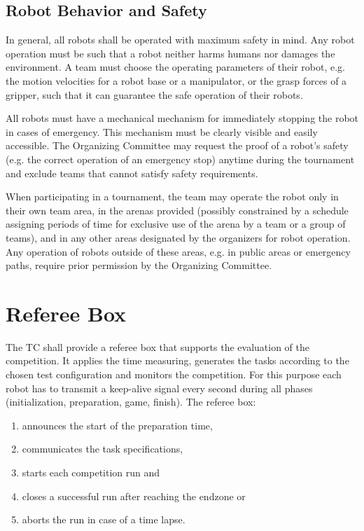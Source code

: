 \subsection{Robot Behavior and Safety}
In general, all robots shall be operated with maximum safety in mind. Any robot operation must be such that a robot neither harms humans nor damages the environment. A team must choose the operating parameters of their robot, e.g. the motion velocities for a robot base or a manipulator, or the grasp forces of a gripper, such that it can guarantee the safe operation of their robots.
\par
All robots must have a mechanical mechanism for immediately stopping the robot in cases of emergency. This mechanism must be clearly visible and easily accessible. The Organizing Committee may request the proof of a robot’s safety (e.g. the correct operation of an emergency stop) anytime during the tournament and exclude teams that cannot satisfy safety requirements.
\par
When participating in a tournament, the team may operate the robot only in their own team area, in the arenas provided (possibly constrained by a schedule assigning periods of time for exclusive use of the arena by a team or a group of teams), and in any other areas designated by the organizers for robot operation. Any operation of robots outside of these areas, e.g. in public areas or emergency paths, require prior permission by the Organizing Committee.

\section{Referee Box}
The TC shall provide a referee box that supports the evaluation of the competition. It applies the time measuring, generates the tasks according to the chosen test configuration and monitors the
competition. For this purpose each robot has to transmit a keep-alive signal every second during all phases (initialization, preparation, game, finish). The referee box:

\begin{enumerate}
  \item announces the start of the preparation time,
  \item communicates the task specifications,
  \item starts each competition run and
  \item closes a successful run after reaching the endzone or
  \item aborts the run in case of a time lapse.
\end{enumerate}


